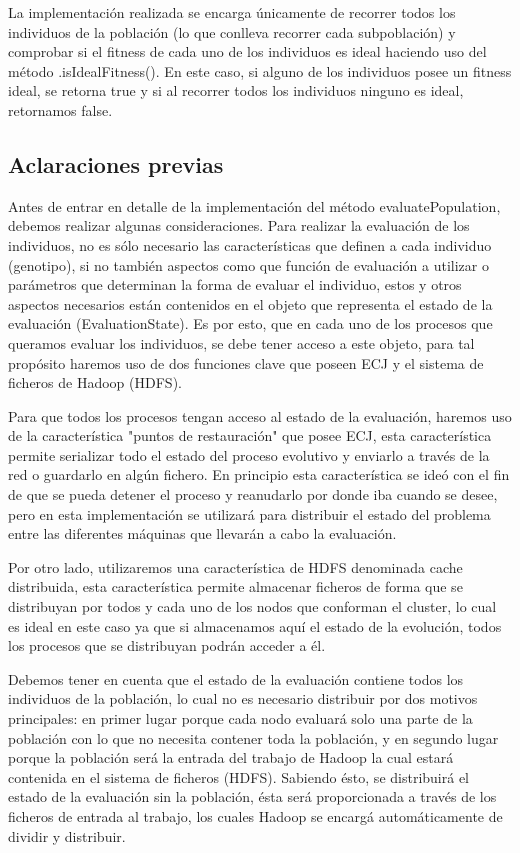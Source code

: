 La implementación realizada se encarga únicamente de recorrer todos los individuos de la población (lo que conlleva recorrer cada subpoblaci\'on) y comprobar si el fitness de cada uno de los individuos es ideal haciendo uso del método .isIdealFitness(). En este caso, si alguno de los individuos posee un fitness ideal, se retorna true y si al recorrer todos los individuos ninguno es ideal, retornamos false.

\subsection{Aclaraciones previas}

Antes de entrar en detalle de la implementación del método evaluatePopulation, debemos realizar algunas consideraciones. Para realizar la evaluación de los individuos, no es s\'olo necesario las características que definen a cada individuo (genotipo), si no también aspectos como que función de evaluación a utilizar o parámetros que determinan la forma de evaluar el individuo, estos y otros aspectos necesarios est\'an contenidos en el objeto que representa el estado de la evaluación (EvaluationState). Es por esto, que en cada uno de los procesos que queramos evaluar los individuos, se debe tener acceso a este objeto, para tal propósito haremos uso de dos funciones clave que poseen ECJ y el sistema de ficheros de Hadoop (HDFS).

Para que todos los procesos tengan acceso al estado de la evaluación, haremos uso de la característica "puntos de restauración" que posee ECJ, esta característica permite serializar todo el estado del proceso evolutivo y enviarlo a través de la red o guardarlo en algún fichero. En principio esta característica se ide\'o con el fin de que se pueda detener el proceso y reanudarlo por donde iba cuando se desee, pero en esta implementación se utilizar\'a para distribuir el estado del problema entre las diferentes m\'aquinas que llevar\'an a cabo la evaluación.

Por otro lado, utilizaremos una característica de HDFS denominada cache distribuida, esta característica permite almacenar ficheros de forma que se distribuyan por todos y cada uno de los nodos que conforman el cluster, lo cual es ideal en este caso ya que si almacenamos aquí el estado de la evolución, todos los procesos que se distribuyan podrán acceder a \'el.

Debemos tener en cuenta que el estado de la evaluación contiene todos los individuos de la población, lo cual no es necesario distribuir por dos motivos principales: en primer lugar porque cada nodo evaluar\'a solo una parte de la población con lo que no necesita contener toda la población, y en segundo lugar porque la población ser\'a la entrada del trabajo de Hadoop la cual estará contenida en el sistema de ficheros (HDFS). Sabiendo \'esto, se distribuirá el estado de la evaluación sin la población, \'esta ser\'a proporcionada a través de los ficheros de entrada al trabajo, los cuales Hadoop se encarg\'a automáticamente de dividir y distribuir.

